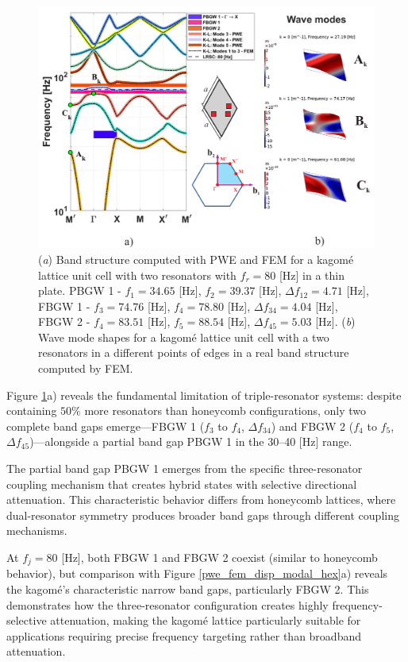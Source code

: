 \documentclass[review,numbers,sort&compress]{elsarticle}
\begin{document}
\begin{figure}[htb]
	\centering
	\includegraphics[width=1\textwidth]{1_5_disp_frf_kag.pdf}
	\caption{(\textit{a}) Band structure computed with PWE and FEM for a kagomé lattice unit cell with two resonators with $f_r = 80$ [Hz] in a thin plate. PBGW 1 - $f_1 = 34.65$ [Hz], $f_2 = 39.37$ [Hz], $\Delta f_{12} = 4.71 $ [Hz], FBGW 1 - $f_3 = 74.76$ [Hz], $f_4 = 78.80$ [Hz], $\Delta f_{34} = 4.04 $ [Hz], FBGW 2 - $f_4 = 83.51$ [Hz], $f_5 = 88.54$ [Hz], $\Delta f_{45} = 5.03 $ [Hz]. (\textit{b}) Wave mode shapes for a kagomé lattice unit cell with a two resonators in a different points of edges in a real band structure computed by FEM.}
	\label{pwe_fem_disp_modal_kag}
    \end{figure}

Figure \ref{pwe_fem_disp_modal_kag}a) reveals the fundamental limitation of triple-resonator systems: despite containing $50\%$ more resonators than honeycomb configurations, only two complete band gaps emerge—FBGW 1 (\( f_3 \) to \( f_4 \), \( \Delta f_{34} \)) and FBGW 2 (\( f_4 \) to \( f_5 \), \( \Delta f_{45} \))—alongside a partial band gap PBGW 1 in the 30–40 [Hz] range.

The partial band gap PBGW 1 emerges from the specific three-resonator coupling mechanism that creates hybrid states with selective directional attenuation. This characteristic behavior differs from honeycomb lattices, where dual-resonator symmetry produces broader band gaps through different coupling mechanisms.

At \( f_j = 80 \) [Hz], both FBGW 1 and FBGW 2 coexist (similar to honeycomb behavior), but comparison with Figure \ref{pwe_fem_disp_modal_hex}a) reveals the kagomé's characteristic narrow band gaps, particularly FBGW 2. This demonstrates how the three-resonator configuration creates highly frequency-selective attenuation, making the kagomé lattice particularly suitable for applications requiring precise frequency targeting rather than broadband attenuation. 
\end{document}

